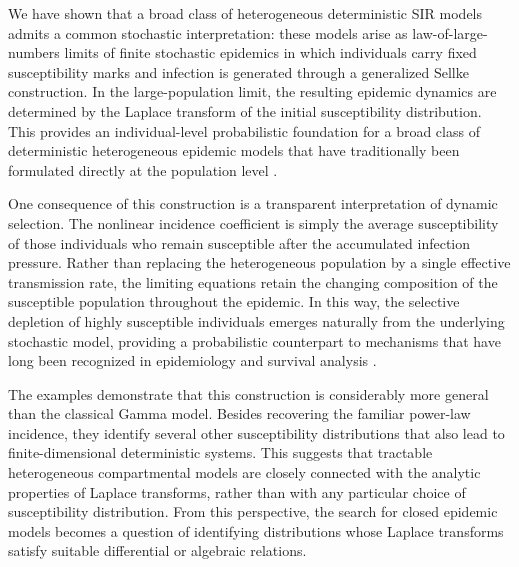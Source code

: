 \documentclass[pdflatex,sn-mathphys-ay]{sn-jnl}
\theoremstyle{thmstyleone}
\theoremstyle{thmstyletwo}
\theoremstyle{thmstylethree}
\begin{document}
We have shown that a broad class of heterogeneous deterministic SIR models
admits a common stochastic interpretation: these models arise as
law-of-large-numbers limits of finite stochastic epidemics in which individuals
carry fixed susceptibility marks and infection is generated through a
generalized Sellke construction. In the large-population limit, the
resulting epidemic dynamics are determined by the Laplace transform of the
initial susceptibility distribution. This provides an individual-level
probabilistic foundation for a broad class of deterministic heterogeneous
epidemic models that have traditionally been formulated directly at the
population level
\citep{Novozhilov2008,Katriel2009,DiekmannInaba2023}.

One consequence of this construction is a transparent interpretation of
dynamic selection. The nonlinear incidence coefficient is simply the average
susceptibility of those individuals who remain susceptible after the
accumulated infection pressure. Rather than replacing the heterogeneous
population by a single effective transmission rate, the limiting equations
retain the changing composition of the susceptible population throughout the
epidemic. In this way, the selective depletion of highly susceptible
individuals emerges naturally from the underlying stochastic model, providing
a probabilistic counterpart to mechanisms that have long been recognized in
epidemiology and survival analysis
\citep{VaupelYashin1985,GomesEtAl2022,Aalen1994}.

The examples demonstrate that this construction is considerably more general
than the classical Gamma model. Besides recovering the familiar power-law
incidence, they identify several other susceptibility distributions that also
lead to finite-dimensional deterministic systems. This suggests that
tractable heterogeneous compartmental models are closely connected with the
analytic properties of Laplace transforms, rather than with any particular
choice of susceptibility distribution. From this perspective, the search for
closed epidemic models becomes a question of identifying distributions whose
Laplace transforms satisfy suitable differential or algebraic relations.
\end{document}
